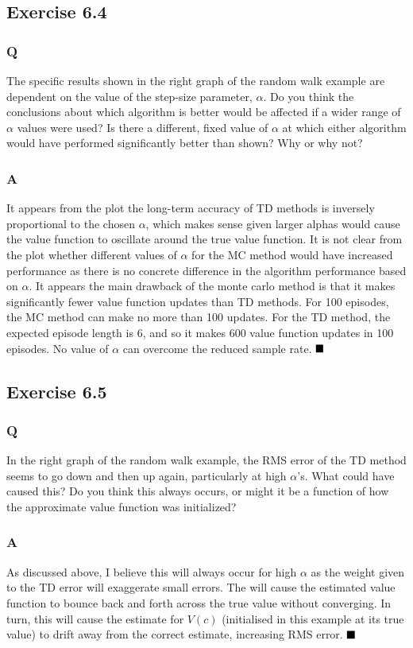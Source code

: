 \subsection{Exercise 6.4}
\subsubsection{Q}
The specific results shown in the right graph of the random walk example are dependent on the value of the step-size parameter, $\alpha$. Do you think the conclusions
about which algorithm is better would be affected if a wider range of $\alpha$ values were used? Is there a different, fixed value of $\alpha$ at which either algorithm would have performed significantly better than shown? Why or why not?
\subsubsection{A}
It appears from the plot the long-term accuracy of TD methods is inversely proportional to the chosen $\alpha$, which makes sense given larger alphas would cause the value function to oscillate around the true value function. It is not clear from the plot whether different values of $\alpha$ for the MC method would have increased performance as there is no concrete difference in the algorithm performance based on $\alpha$. It appears the main drawback of the monte carlo method is that it makes significantly fewer value function updates than TD methods. For 100 episodes, the MC method can make no more than 100 updates. For the TD method, the expected episode length is 6, and so it makes 600 value function updates in 100 episodes. No value of $\alpha$ can overcome the reduced sample rate.
$
\hfill \blacksquare
$

\subsection{Exercise 6.5}
\subsubsection{Q}
In the right graph of the random walk example, the RMS error of the TD method seems to go down and then up again, particularly at high $\alpha$’s. What could have caused this? Do you think this always occurs, or might it be a function of how the approximate value function was initialized?
\subsubsection{A}
As discussed above, I believe this will always occur for high $\alpha$ as the weight given to the TD error will exaggerate small errors. The will cause the estimated value function to bounce back and forth across the true value without converging. In turn, this will cause the estimate for $V(c)$ (initialised in this example at its true value) to drift away from the correct estimate, increasing RMS error.
$
\hfill \blacksquare
$

